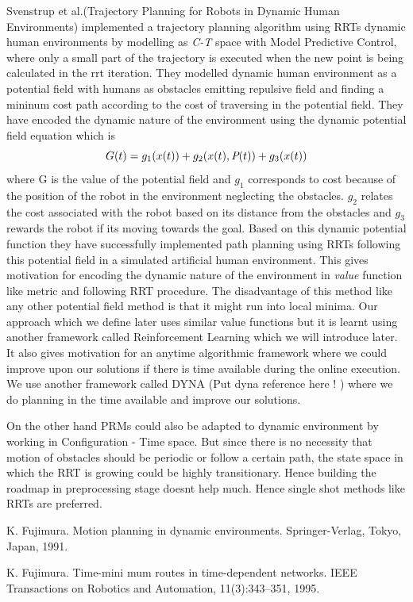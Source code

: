 \documentclass[MTech]{iitmdiss}
\begin{document}
Svenstrup et al.(Trajectory Planning for Robots in Dynamic Human Environments) implemented a trajectory planning algorithm using RRTs dynamic human environments by modelling as \emph{C-T} space with Model Predictive Control, where only a small part of the trajectory is executed when the new point is being calculated in the rrt iteration. They modelled dynamic human environment as a potential field with humans as obstacles emitting repulsive field and finding a mininum cost path according to the cost of traversing in the potential field. They have encoded the dynamic nature of the environment using the dynamic potential field equation which is 
$$G(t) = g_1(x(t)) + g_2(x(t), \emph{P}(t) )+ g_3(x(t)) $$
where G is the value of the potential field and $g_1$ corresponds to cost because of the position of the robot in the environment neglecting the obstacles. $g_2$ relates the cost associated with the robot based on its distance from the obstacles and $g_3$ rewards the robot if its moving towards the goal. Based on this dynamic potential function they have successfully implemented path planning using RRTs following this potential field in a simulated artificial human environment. This gives motivation for encoding the dynamic nature of the environment in \textit{value} function like metric and following RRT procedure. The disadvantage of this method like any other potential field method is that it might run into local minima. Our approach which we define later uses similar value functions but it is learnt using another framework called Reinforcement Learning which we will introduce later. It also gives motivation for an anytime algorithmic framework where we could improve upon our solutions if there is time available during the online execution. We use another framework called DYNA (Put dyna reference here ! ) where we do planning in the time available and improve our solutions. 

On the other hand PRMs could also be adapted to dynamic environment by working in Configuration - Time space. But since there is no necessity that motion of obstacles should be periodic or follow a certain path, the state space in which the RRT is growing could be highly transitionary. Hence building the roadmap in preprocessing stage doesnt help much. Hence single shot methods like RRTs are preferred. 


K. Fujimura. Motion planning in dynamic environments. Springer-Verlag, Tokyo, Japan, 1991.

K. Fujimura. Time-mini mum routes in time-dependent networks. IEEE Transactions
on Robotics and Automation, 11(3):343–351, 1995.
 
\end{document}
